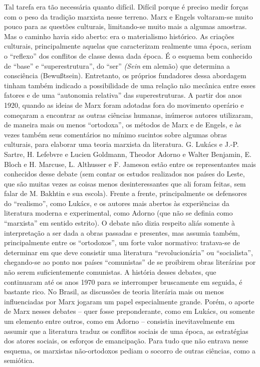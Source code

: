 Tal tarefa era tão necessária quanto difícil. Difícil porque é preciso
medir forças com o peso da tradição marxista nesse terreno. Marx e
Engels voltaram-se muito pouco para as questões culturais, limitando-se
muito mais a algumas amostras. Mas o caminho havia sido aberto: era o
materialismo histórico. As criações culturais, principalmente aquelas
que caracterizam realmente uma época, seriam o ``reflexo'' dos conflitos
de classe dessa dada época. É o esquema bem conhecido de ``base'' e
``superestrutura'', do ``ser'' \emph{(Sein} em alemão) que determina a
consciência (Bewußtsein). Entretanto, os próprios fundadores dessa
abordagem tinham também indicado a possibilidade de uma relação não
mecânica entre esses fatores e de uma ``autonomia relativa'' das
superestruturas. A partir dos anos 1920, quando as ideias de Marx foram
adotadas fora do movimento operário e começaram a encontrar as outras
ciências humanas, inúmeros autores utilizaram, de maneira mais ou menos
``ortodoxa'', os métodos de Marx e de Engels, e às vezes também seus
comentários no mínimo sucintos sobre algumas obras culturais, para
elaborar uma teoria marxista da literatura. G. Lukács e J.-P. Sartre, H.
Lefebvre e Lucien Goldmann, Theodor Adorno e Walter Benjamin, E. Bloch e
H. Marcuse, L. Althusser e F. Jameson estão entre os representantes mais
conhecidos desse debate (sem contar os estudos realizados nos países do
Leste, que são muitas vezes as coisas menos desinteressantes que ali
foram feitas, sem falar de M. Bakhtin e sua escola). Frente a frente,
principalmente os defensores do ``realismo'', como Lukács, e os autores
mais abertos às experiências da literatura moderna e experimental, como
Adorno (que não se definia como ``marxista'' em sentido estrito). O
debate não dizia respeito aliás somente à interpretação a ser dada a
obras passadas e presentes, mas assumia também, principalmente entre os
``ortodoxos'', um forte valor normativo: tratava-se de determinar em que
deve consistir uma literatura ``revolucionária'' ou ``socialista'',
chegando-se ao ponto nos países ``comunistas'' de se proibirem obras
literárias por não serem suficientemente comunistas. A história desses
debates, que continuaram até os anos 1970 para se interromper
bruscamente em seguida, é bastante rico. No Brasil, as discussões de
teoria literária mais ou menos influenciadas por Marx jogaram um papel
especialmente grande. Porém, o aporte de Marx nesses debates -- quer
fosse preponderante, como em Lukács, ou somente um elemento entre
outros, como em Adorno -- consistia inevitavelmente em assumir que a
literatura traduz os conflitos sociais de uma época, as estratégias dos
atores sociais, os esforços de emancipação. Para tudo que não entrava
nesse esquema, os marxistas não-ortodoxos pediam o socorro de outras
ciências, como a semiótica.

